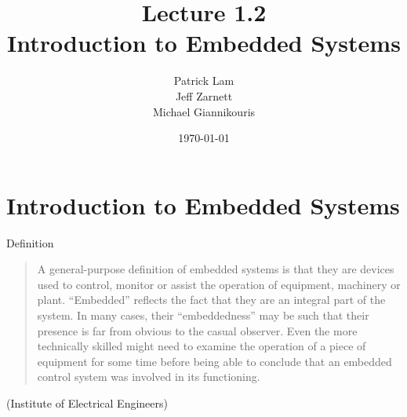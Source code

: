 \documentclass[aspectratio=169]{beamer}
\title{Lecture 1.2 \\ Introduction to Embedded Systems}
\date{\today}
\author{Patrick Lam \\ Jeff Zarnett \\ Michael Giannikouris}
\institute{Department of Electrical and Computer Engineering}
\begin{document}
\maketitle

\section{Introduction to Embedded Systems}
	
	\begin{frame}{Definition}

		\begin{center}
			\begin{quote}
				A general-purpose definition of embedded systems is that they are
				devices used to control, monitor or assist the operation of equipment,
				machinery or plant. “Embedded” reflects the fact that they are an
				integral part of the system. In many cases, their “embeddedness” may
				be such that their presence is far from obvious to the casual observer.
				Even the more technically skilled might need to examine the operation
				of a piece of equipment for some time before being able to conclude
				that an embedded control system was involved in its functioning.
			\end{quote}
		\end{center}
		
		\begin{flushright}			
			(Institute of Electrical Engineers)
		\end{flushright}	
		
	\end{frame}  
	
\end{document}
